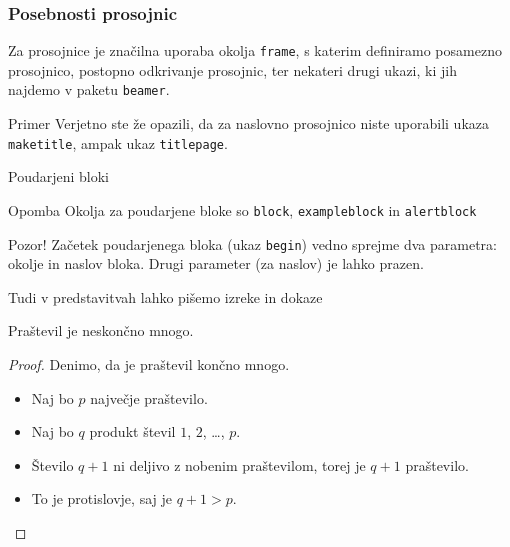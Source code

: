 \begin{frame}
	\frametitle{Posebnosti prosojnic}


	Za prosojnice je značilna uporaba okolja \texttt{frame},
	s katerim definiramo posamezno prosojnico,
	\pause
	postopno odkrivanje prosojnic,
	\pause
	ter nekateri drugi ukazi, ki jih najdemo v paketu \texttt{beamer}.
	\pause
	\begin{exampleblock}{Primer}
		Verjetno ste že opazili, da za naslovno prosojnico niste uporabili
		ukaza \texttt{maketitle}, ampak ukaz \texttt{titlepage}.
	\end{exampleblock}
\end{frame}

\begin{frame}{Poudarjeni bloki}
    \begin{block}{Opomba}
	Okolja za poudarjene bloke so \texttt{block}, \texttt{exampleblock} in \texttt{alertblock}
    \end{block}

	\begin{alertblock}{Pozor!}
		Začetek poudarjenega bloka (ukaz \texttt{begin}) vedno sprejme 
		dva parametra: okolje in naslov bloka.
		Drugi parameter (za naslov) je lahko prazen. 

	\end{alertblock}

		

\end{frame}

\begin{frame}{Tudi v predstavitvah lahko pišemo izreke in dokaze}

	\begin{izrek}
	   Praštevil je neskončno mnogo.
	\end{izrek}
	\begin{proof}
	   Denimo, da je praštevil končno mnogo.
	   \begin{itemize}
		  \item<1-> Naj bo $p$ \alert<4->{največje} praštevilo.
		  \item <2->Naj bo $q$ produkt števil $1$, $2$, \ldots, $p$.
		  \item <3->Število $q+1$ ni deljivo z nobenim praštevilom, torej je $q+1$ praštevilo.
		  \item <4->To je protislovje, saj je $q+1>p$. \qedhere
	   \end{itemize}
	\end{proof}
 \end{frame}
 